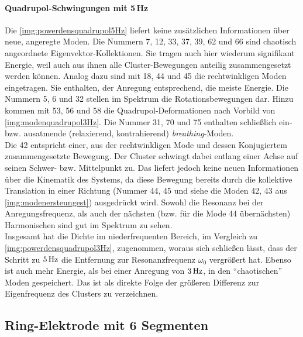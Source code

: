 \documentclass[numbers=noenddot,a4paper,notitlepage,twoside,BCOR15mm]{scrbook}
\newcommand{\ix}[1]{_\text{#1}}
\newcommand{\tilt}[1]{\textit{#1}}
\begin{document}
				\newpage

					\paragraph{Quadrupol-Schwingungen mit 5\,Hz}

						Die \ref{img:powerdensquadrupol5Hz} liefert keine zusätzlichen Informationen über neue, angeregte Moden. Die Nummern 7, 12, 33, 37, 39, 62 und 66 sind chaotisch angeordnete Eigenvektor-Kollektionen. Sie tragen auch hier wiederum signifikant Energie, weil auch aus ihnen alle Cluster-Bewegungen anteilig zusammengesetzt werden können. Analog dazu sind mit 18, 44 und 45 die rechtwinkligen Moden eingetragen. Sie enthalten, der Anregung entsprechend, die meiste Energie. Die Nummern 5, 6 und 32 stellen im Spektrum die Rotationsbewegungen dar.  Hinzu kommen mit 53, 56 und 58 die Quadrupol-Deformationen nach Vorbild von \ref{img:modenquadrupol3Hz}. Die Nummer 31, 70 und 75 enthalten schließlich ein- bzw. ausatmende (relaxierend, kontrahierend) \tilt{breathing}-Moden.\\
						Die 42 entspricht einer, aus der rechtwinkligen Mode und dessen Konjugiertem zusammengesetzte Bewegung. Der Cluster schwingt dabei entlang einer Achse auf seinen Schwer- bzw. Mittelpunkt zu. Das liefert jedoch keine neuen Informationen über die Kinematik des Systems, da diese Bewegung bereits durch die kollektive Translation in einer Richtung (Nummer 44, 45 und siehe die Moden 42, 43 aus \ref{img:modenersteungest}) ausgedrückt wird. Sowohl die Resonanz bei der Anregungsfrequenz, als auch der nächsten (bzw. für die Mode 44 übernächsten) Harmonischen sind gut im Spektrum zu sehen.\\
						Insgesamt hat die Dichte im niederfrequenten Bereich, im Vergleich zu \ref{img:powerdensquadrupol3Hz}, zugenommen, woraus sich schließen lässt, dass der Schritt zu $\unit[5]{Hz}$ die Entfernung zur Resonanzfrequenz $\omega\ix{0}$ vergrößert hat. Ebenso ist auch mehr Energie, als bei einer Anregung von $\unit[3]{Hz}$, in den "`chaotischen"' Moden gespeichert. Das ist als direkte Folge der größeren Differenz zur Eigenfrequenz des Clusters zu verzeichnen. 

				\subsection*{Ring-Elektrode mit 6 Segmenten}

\end{document}
